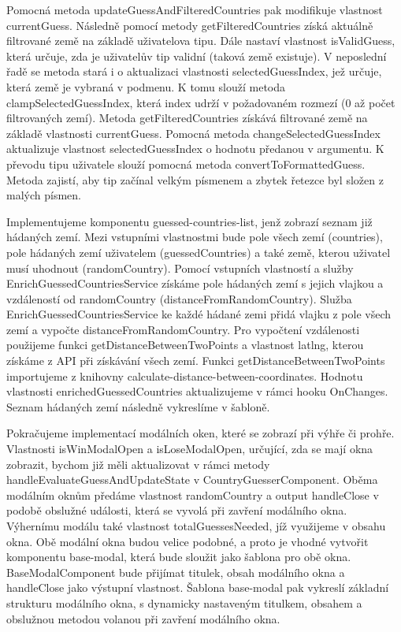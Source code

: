 Pomocná metoda updateGuessAndFilteredCountries pak modifikuje vlastnost currentGuess. 
Následně pomocí metody getFilteredCountries získá aktuálně filtrované země na základě uživatelova tipu. 
Dále nastaví vlastnost isValidGuess, která určuje, zda je uživatelův tip validní (taková země existuje). 
V neposlední řadě se metoda stará i o aktualizaci vlastnosti selectedGuessIndex, jež určuje, která země je vybraná v podmenu. 
K tomu slouží metoda clampSelectedGuessIndex, která index udrží v požadovaném rozmezí (0 až počet filtrovaných zemí).
Metoda getFilteredCountries získává filtrované země na základě vlastnosti currentGuess. 
Pomocná metoda changeSelectedGuessIndex aktualizuje vlastnost selectedGuessIndex o hodnotu předanou v argumentu. 
K převodu tipu uživatele slouží pomocná metoda convertToFormattedGuess. Metoda zajistí, aby tip začínal velkým písmenem a zbytek řetezce byl složen z malých písmen.

Implementujeme komponentu guessed-countries-list, jenž zobrazí seznam již hádaných zemí. 
Mezi vstupními vlastnostmi bude pole všech zemí (countries), pole hádaných zemí uživatelem (guessedCountries) a také země, kterou uživatel musí uhodnout (randomCountry).
Pomocí vstupních vlastností a služby EnrichGuessedCountriesService získáme pole hádaných zemí s jejich vlajkou a vzdáleností od randomCountry (distanceFromRandomCountry).
Služba EnrichGuessedCountriesService ke každé hádané zemi přidá vlajku z pole všech zemí a vypočte distanceFromRandomCountry. 
Pro vypočtení vzdálenosti použijeme funkci getDistanceBetweenTwoPoints a vlastnost latlng, kterou získáme z API při získávání všech zemí. 
Funkci getDistanceBetweenTwoPoints importujeme z knihovny calculate-distance-between-coordinates. 
Hodnotu vlastnosti enrichedGuessedCountries aktualizujeme v rámci hooku OnChanges. Seznam hádaných zemí následně vykreslíme v šabloně.

Pokračujeme implementací modálních oken, které se zobrazí při výhře či prohře. 
Vlastnosti isWinModalOpen a isLoseModalOpen, určující, zda se mají okna zobrazit, bychom již měli aktualizovat v rámci metody handleEvaluateGuessAndUpdateState v CountryGuesserComponent. 
Oběma modálním oknům předáme vlastnost randomCountry a output handleClose v podobě obslužné události, která se vyvolá při zavření modálního okna. 
Výhernímu modálu také vlastnost totalGuessesNeeded, jíž využijeme v obsahu okna. 
Obě modální okna budou velice podobné, a proto je vhodné vytvořit komponentu base-modal, která bude sloužit jako šablona pro obě okna. 
BaseModalComponent bude přijímat titulek, obsah modálního okna a handleClose jako výstupní vlastnost. 
Šablona base-modal pak vykreslí základní strukturu modálního okna, s dynamicky nastaveným titulkem, obsahem a obslužnou metodou volanou při zavření modálního okna.

